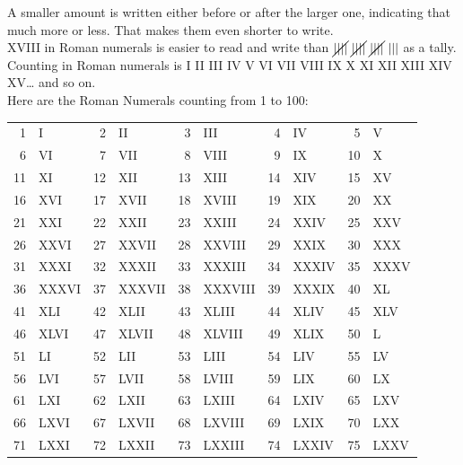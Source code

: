 \documentclass[12pt]{article}
\begin{document}
\begin{enumerate}
A smaller amount is written either before or after the larger one, indicating that much more or less. That makes them even shorter to write.\\

XVIII in Roman numerals is easier to read and write than $\cancel{||||}\ \cancel{||||}\ \cancel{||||}\ |||$ as a tally.\\

Counting in Roman numerals is I II III IV V VI VII VIII IX X XI XII XIII XIV XV… and so on.\\

Here are the Roman Numerals counting from 1 to 100:\\
\begin{center}
\begin{table}[ht]
\scriptsize
\renewcommand*{\arraystretch}{1.4}
\begin{tabular}{rlrlrlrlrl}
1  & I      & 2  & II      & 3  & III      & 4  & IV     & 5  & V    \\
6  & VI     & 7  & VII     & 8  & VIII     & 9  & IX     & 10 & X    \\
11 & XI     & 12 & XII     & 13 & XIII     & 14 & XIV    & 15 & XV   \\
16 & XVI    & 17 & XVII    & 18 & XVIII    & 19 & XIX    & 20 & XX   \\
21 & XXI    & 22 & XXII    & 23 & XXIII    & 24 & XXIV   & 25 & XXV  \\
26 & XXVI   & 27 & XXVII   & 28 & XXVIII   & 29 & XXIX   & 30 & XXX  \\
31 & XXXI   & 32 & XXXII   & 33 & XXXIII   & 34 & XXXIV  & 35 & XXXV \\
36 & XXXVI  & 37 & XXXVII  & 38 & XXXVIII  & 39 & XXXIX  & 40 & XL   \\
41 & XLI    & 42 & XLII    & 43 & XLIII    & 44 & XLIV   & 45 & XLV  \\
46 & XLVI   & 47 & XLVII   & 48 & XLVIII   & 49 & XLIX   & 50 & L    \\
51 & LI     & 52 & LII     & 53 & LIII     & 54 & LIV    & 55 & LV   \\
56 & LVI    & 57 & LVII    & 58 & LVIII    & 59 & LIX    & 60 & LX   \\
61 & LXI    & 62 & LXII    & 63 & LXIII    & 64 & LXIV   & 65 & LXV  \\
66 & LXVI   & 67 & LXVII   & 68 & LXVIII   & 69 & LXIX   & 70 & LXX  \\
71 & LXXI   & 72 & LXXII   & 73 & LXXIII   & 74 & LXXIV  & 75 & LXXV \\

\end{tabular}
\end{table}
\end{center}
\end{enumerate}
\end{document}
